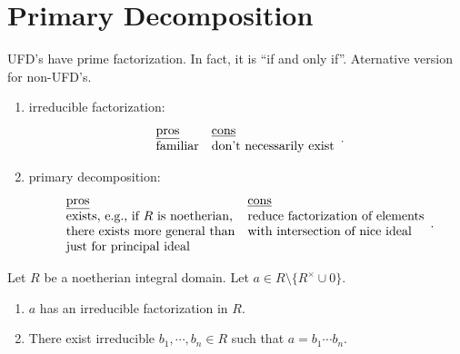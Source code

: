 \chapter{Primary Decomposition}

\begin{discussion}
    UFD's have prime factorization. In fact, it is ``if and only if''. Aternative version for non-UFD's.
    \begin{enumerate}
        \item irreducible factorization: 
            \[
                \begin{array}{ll}
                    \text{\underline{pros}} & \text{\underline{cons}} \\
                    \text{familiar} & \text{don't necessarily exist} 
                \end{array}.
            \]
        \item 
            primary decomposition:
            \[
                \begin{array}{ll}
                    \text{\underline{pros}} & \text{\underline{cons}} \\
                    \text{exists, e.g., if $R$ is noetherian,} & \text{reduce factorization of elements} \\
                \text{there exists more general than} & \text{with intersection of nice ideal}\\
                \text{just for principal ideal}
                \end{array}.
            \]
    \end{enumerate}
\end{discussion}

\begin{theorem}
    Let $R$ be a noetherian integral domain. Let $a \in R \setminus \{R^{\times} \cup 0\}$.
    \begin{enumerate}
        \item $a$ has an irreducible factorization in $R$.
        \item There exist irreducible $b_1,\cdots,b_n \in R$ such that $a = b_1 \cdots b_n$.
    \end{enumerate}
\end{theorem}

